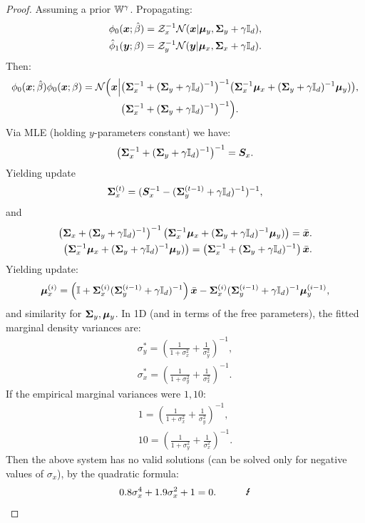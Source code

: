 \documentclass[a4paper,12pt,twoside,openright]{report}
\theoremstyle{definition}
\begin{document}
\begin{proof}
 Assuming a prior $\mathbb{W}^{\gamma}$. Propagating:
\begin{align*}
\phi_0( {\bm{x}} ; \hat{\beta}) = \mathcal{Z}_x^{-1} {\mathcal{N}}({\bm{x}}| {\bm{\mu}}_y, {\bm{\Sigma}}_y + \gamma {\mathbb{I}_d}),  \\
{{\hat{\phi}}}_1( {\bm{y}} ; {\beta}) = \mathcal{Z}_y^{-1}  {\mathcal{N}}({\bm{y}}| {\bm{\mu}}_x, {\bm{\Sigma}}_x + \gamma {\mathbb{I}_d}).
\end{align*}
Then:
\begin{align*}
 \phi_0( {\bm{x}} ; \hat{\beta})  \phi_0({\bm{x}} ; \beta) = {\mathcal{N}}\Big({\bm{x}} \Big|& \big({\bm{\Sigma}}_x^{-1} + ({\bm{\Sigma}}_y + \gamma {\mathbb{I}_d})^{-1}\big)^{-1}\big( {\bm{\Sigma}}_x^{-1}{\bm{\mu}}_x + ({\bm{\Sigma}}_y + \gamma {\mathbb{I}_d})^{-1}{\bm{\mu}}_y)\big), \\ &\big({\bm{\Sigma}}_x^{-1} + ({\bm{\Sigma}}_y + \gamma {\mathbb{I}_d})^{-1}\big)^{-1} \Big).
\end{align*}
Via MLE (holding $y$-parameters constant) we have:
\begin{align*}
\left({\bm{\Sigma}}_x^{-1} + ({\bm{\Sigma}}_y + \gamma {\mathbb{I}_d})^{-1}\right)^{-1}  = {\bm{S}}_x.
\end{align*}
Yielding update
\begin{align*}
{\bm{\Sigma}}_x^{(t)} = ({\bm{S}}_x^{-1}  - ({\bm{\Sigma}}_y^{(t-1)} + \gamma {\mathbb{I}_d})^{-1})^{-1} ,
\end{align*}
and 
\begin{align*}
\left({\bm{\Sigma}}_x + ({\bm{\Sigma}}_y + \gamma {\mathbb{I}_d})^{-1}\right)^{-1}\left( {\bm{\Sigma}}_x^{-1}{\bm{\mu}}_x + ({\bm{\Sigma}}_y + \gamma {\mathbb{I}_d})^{-1}{\bm{\mu}}_y)\right) = \bar{{\bm{x}}}. \\
\left( {\bm{\Sigma}}_x^{-1}{\bm{\mu}}_x + ({\bm{\Sigma}}_y + \gamma {\mathbb{I}_d})^{-1}{\bm{\mu}}_y)\right) = \left({\bm{\Sigma}}_x^{-1} + ({\bm{\Sigma}}_y + \gamma {\mathbb{I}_d})^{-1}\right)\bar{{\bm{x}}} .
\end{align*}
Yielding update:
\begin{align*}
{\bm{\mu}}_x^{(i)}  = \left(\mathbb{I} + {\bm{\Sigma}}_x^{(i)}({\bm{\Sigma}}_y^{(i-1)} + \gamma {\mathbb{I}_d})^{-1}\right)\bar{{\bm{x}}} -  {\bm{\Sigma}}_x^{(i)}({\bm{\Sigma}}_y^{(i-1)} + \gamma {\mathbb{I}_d})^{-1}{\bm{\mu}}_y^{(i-1)},
\end{align*}
and similarity  for ${\bm{\Sigma}}_y, {\bm{\mu}}_y$.
In 1D (and in terms of the free parameters), the fitted marginal density variances are:
\begin{align*}
\sigma_y^{*} = \left(\frac{1}{1+\sigma^2_x} + \frac{1}{\sigma^2_y}\right)^{-1} ,\\
\sigma_x^{*} = \left(\frac{1}{1+\sigma^2_y} + \frac{1}{\sigma^2_x}\right)^{-1}.
\end{align*}
If the empirical marginal variances were $1,10$:
\begin{align*}
1 = \left(\frac{1}{1+\sigma^2_x} + \frac{1}{\sigma^2_y}\right)^{-1}, \\
10 = \left(\frac{1}{1+\sigma^2_y} + \frac{1}{\sigma^2_x}\right)^{-1}.
\end{align*}
Then the above system has no valid solutions (can be solved only for negative values of $\sigma_x$), by the quadratic formula:
\begin{align*}
0.8 \sigma_x^4 + 1.9 \sigma_x^2 + 1 = 0. \quad \quad \quad \text{\Lightning}
\end{align*}

\end{proof}
\end{document}
